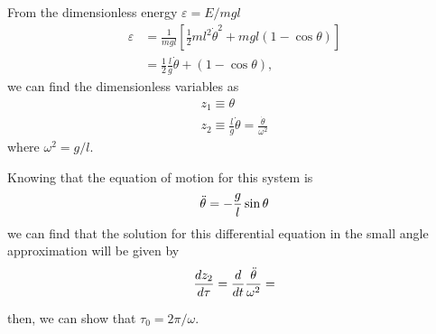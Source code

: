 \subsection{}
From the dimensionless energy $\varepsilon=E/mgl$ 
\begin{align*}
    \varepsilon&=\frac{1}{mgl}\left[\frac{1}{2}ml^2\dot{\theta}^2+mgl(1-\cos\theta)\right]\\
    &=\frac{1}{2}\frac{l}{g}\dot{\theta} + (1-\cos\theta),
\end{align*}
we can find the dimensionless variables as
\begin{align*}
    z_1\equiv\theta\\
    z_2\equiv\frac{l}{g}\dot{\theta}=\frac{\dot{\theta}}{\omega^2}
\end{align*}
where $\omega^2=g/l$.

Knowing that the equation of motion for this system is 
\begin{equation*}
    \Ddot{\theta}=-\frac{g}{l}\sin\theta
    \label{eq:pendEqMotion}
\end{equation*}
we can find that the solution for this differential equation in the small angle approximation will be given by
\begin{equation*}
\frac{dz_2}{d\tau}=\frac{d}{dt}
\frac{\Ddot{\theta}}{\omega^2}=    
\end{equation*}


then, we can show that
$\tau_0=2\pi/\omega$.

\subsection{}

